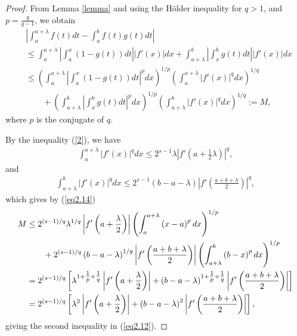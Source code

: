 \documentclass{amsart}
\theoremstyle{plain}
\numberwithin{equation}{section}
\begin{document}
\begin{proof}
From Lemma \ref{lemma} and using the H\"{o}lder inequality for $q
> 1$, and $p = \frac{q}{q-1}$, we obtain
\begin{align}
&\left| {\int_a^{a + \lambda } {f\left( t \right)dt}  - \int_a^b
{f\left( t \right)g\left( t \right)dt} } \right|
\nonumber\\
&\le \int_a^{a + \lambda } { \left| {\int_a^x {\left( {1 - g\left(
t \right)} \right)dt} } \right|\left| {f'\left( x \right)}
\right|dx} + \int_{a + \lambda }^b {\left| {\int_x^b {g\left( t
\right)dt} } \right| \left| {f'\left( x \right)} \right| dx}
\nonumber\\
&\le  \left( {\int_a^{a + \lambda } { \left| {\int_a^x {\left( {1
- g\left( t \right)} \right)dt} } \right|^p dx}} \right)^{1/p}
\left( {\int_a^{a + \lambda } {\left| {f'\left( x \right)}
\right|^q dx}} \right)^{1/q}
\label{eq2.14}\\
&\qquad+ \left( {\int_{a + \lambda }^b {\left| {\int_x^b {g\left(
t \right)dt} } \right|^p dx}} \right)^{1/p} \left( {\int_{a +
\lambda }^b { \left| {f'\left( x \right)} \right|^q dx}}
\right)^{1/q}:=M,\nonumber
\end{align}
where $p$ is the conjugate of $q$.

By the inequality (\ref{2}), we have
\begin{align*}
\int_a^{a + \lambda } {\left| {f'\left( x \right)} \right|^q dx}
\le 2^{s - 1} \lambda \left| {f'\left( {a + \frac{1}{2}\lambda }
\right)} \right|^q,
\end{align*}
and
\begin{align*}
\int_{a + \lambda }^b {\left| {f'\left( x \right)} \right|^q dx}
\le 2^{s - 1} \left( {b - a - \lambda} \right) \left| {f'\left(
{\frac{{a + b + \lambda }}{2}} \right)} \right|^q,
\end{align*}
which gives by (\ref{eq2.14})
\begin{align*}
M &\le 2^{\left( {s - 1} \right)/q} \lambda^{1/q}\left| {f'\left(
{a + \frac{\lambda }{2}} \right)} \right| \left( {\int_a^{a +
\lambda } { \left( {x - a} \right)^pdx} } \right)^{1/p}
\\
&\qquad+ 2^{\left( {s - 1} \right)/q} \left( {b - a - \lambda}
\right)^{1/q}\left| {f'\left( {\frac{{a + b + \lambda }}{2}}
\right)} \right| \left( {\int_{a + \lambda }^b {\left( {b - x }
\right)^pdx}} \right)^{1/p}
\\
&=  2^{\left( {s - 1} \right)/q} \left[ { \lambda ^{1 +
{\textstyle{1 \over p}} + {\textstyle{1 \over q}}} \left|
{f'\left( {a + \frac{\lambda }{2}} \right)} \right|  + \left( {b -
a - \lambda } \right)^{1 + {\textstyle{1 \over p}} + {\textstyle{1
\over q}}} \left| {f'\left( {\frac{{a + b + \lambda }}{2}}
\right)} \right| } \right]
\\
&=2^{\left( {s - 1} \right)/q} \left[ { \lambda^2 \left| {f'\left(
{a + \frac{\lambda }{2}} \right)} \right|  + \left( {b - a -
\lambda } \right)^2 \left| {f'\left( {\frac{{a + b + \lambda
}}{2}} \right)} \right| } \right],
\end{align*}
giving the second inequality in (\ref{eq2.12}).


\end{proof}
\end{document}
